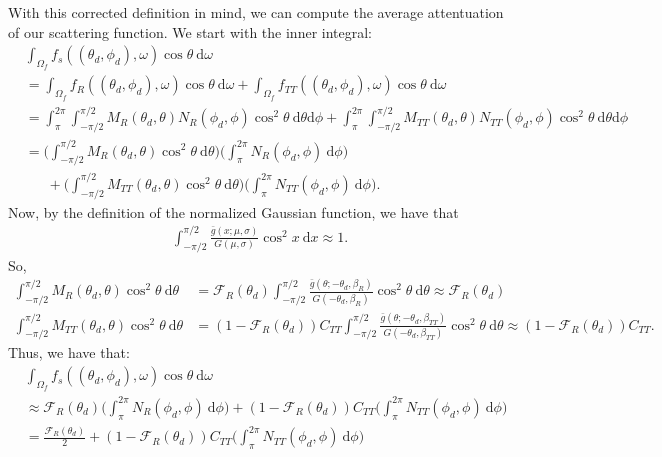 \documentclass[10pt]{article}
\newcommand{\dee}{\mathrm{d}}
\begin{document}
  With this corrected definition in mind, we can compute the average attentuation of our scattering function.  We start with the inner integral:
  \begin{align*}
  	& \int_{\Omega_f} f_s((\theta_d,\phi_d), \omega)\cos\theta\ \dee \omega \\
  	&= \int_{\Omega_f} f_R((\theta_d,\phi_d), \omega)\cos\theta\ \dee \omega
  	+ \int_{\Omega_f} f_{TT}((\theta_d,\phi_d), \omega)\cos\theta\ \dee \omega \\
  	&= \int_{\pi}^{2\pi} \int_{-\pi/2}^{\pi/2} M_R(\theta_d, \theta) N_R(\phi_d, \phi) \cos^2 \theta\ \dee \theta\dee\phi
  	+ \int_{\pi}^{2\pi} \int_{-\pi/2}^{\pi/2} M_{TT}(\theta_d, \theta) N_{TT}(\phi_d, \phi) \cos^2 \theta\ \dee\theta\dee\phi\\
  	&= \bigg( \int_{-\pi/2}^{\pi/2} M_{R}(\theta_d, \theta) \cos^2 \theta\ \dee\theta \bigg) \bigg( \int_{\pi}^{2\pi} N_{R}(\phi_d,\phi)\ \dee\phi \bigg)\\
  	&\phantom{\ =} + \bigg( \int_{-\pi/2}^{\pi/2} M_{TT}(\theta_d, \theta) \cos^2 \theta\ \dee\theta \bigg) \bigg( \int_{\pi}^{2\pi} N_{TT}(\phi_d,\phi)\ \dee\phi \bigg).  
  \end{align*}
  Now, by the definition of the normalized Gaussian function, we have that
  \begin{align*}
  	\int_{-\pi/2}^{\pi/2} \frac{\bar{g}(x;\mu,\sigma)}{G(\mu,\sigma)} \cos^2 x\ \dee x \approx 1.
  \end{align*}
  So,
  \begin{align*}
  	\int_{-\pi/2}^{\pi/2} M_{R}(\theta_d, \theta) \cos^2 \theta\ \dee\theta
  	&= \mathscr{F}_R(\theta_d) \int_{-\pi/2}^{\pi/2} \frac{\bar{g}(\theta;-\theta_d,\beta_R)}{G(-\theta_d,\beta_R)} \cos^2 \theta\ \dee \theta
  	\approx \mathscr{F}_R(\theta_d)\\
  	\int_{-\pi/2}^{\pi/2} M_{TT}(\theta_d, \theta) \cos^2 \theta\ \dee\theta
  	&= (1-\mathscr{F}_R(\theta_d)) C_{TT} \int_{-\pi/2}^{\pi/2} \frac{\bar{g}(\theta;-\theta_d,\beta_{TT})}{G(-\theta_d,\beta_{TT})} \cos^2 \theta\ \dee \theta
  	\approx (1-\mathscr{F}_R(\theta_d)) C_{TT}.
  \end{align*}
  Thus, we have that:
  \begin{align*}
  	& \int_{\Omega_f} f_s((\theta_d,\phi_d), \omega)\cos\theta\ \dee \omega \\
  	&\approx \mathscr{F}_R(\theta_d) \bigg( \int_{\pi}^{2\pi} N_{R}(\phi_d,\phi)\ \dee\phi \bigg) + 
  	(1-\mathscr{F}_R(\theta_d))C_{TT} \bigg( \int_{\pi}^{2\pi} N_{TT}(\phi_d,\phi)\ \dee\phi \bigg) \\
  	&= \frac{\mathscr{F}_R(\theta_d)}{2} + 
  	(1-\mathscr{F}_R(\theta_d))C_{TT} \bigg( \int_{\pi}^{2\pi} N_{TT}(\phi_d,\phi)\ \dee\phi \bigg)
  \end{align*}
\end{document}
